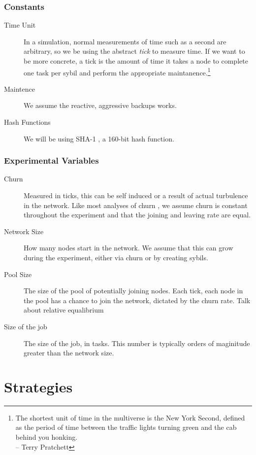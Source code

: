 \subsubsection{Constants}

\begin{description}
	\item [Time Unit] In a simulation, normal measurements of time such as a second are arbitrary, so we be using the abstract \textit{tick} to measure time.  
	If we want to be more concrete, a tick is the amount of time it takes a node to complete one task per sybil and perform the appropriate maintanence.\footnote{The shortest unit of time in the multiverse is the New York Second, defined as the period of time between the traffic lights turning green and the cab behind you honking.\\-- Terry Pratchett}
	\item [Maintence] We assume the reactive, aggressive backups works.
	\item [Hash Functions] We will be using SHA-1 \cite{sha1}, a 160-bit hash function.
\end{description}

\subsubsection{Experimental Variables}
\begin{description}
	\item [Churn] Measured in ticks, this can be self induced or a result of actual turbulence in the network.
	Like most analyses of churn \cite{marozzo2012p2p}, we assume churn is constant throughout the experiment and that the joining and leaving rate are equal.
	\item [Network Size]  How many nodes start in the network.  
		We assume that this can grow during the experiment, either via churn or by creating sybils.
	\item [Pool Size]  The size of the pool of potentially joining nodes.  Each tick, each node in the pool has a chance to join the network, dictated by the churn rate.
		Talk about relative equalibrium
	\item [Size of the job] The size of the job, in tasks.
		This number is typically orders of maginitude greater than the network size.
\end{description}


\section{Strategies}



